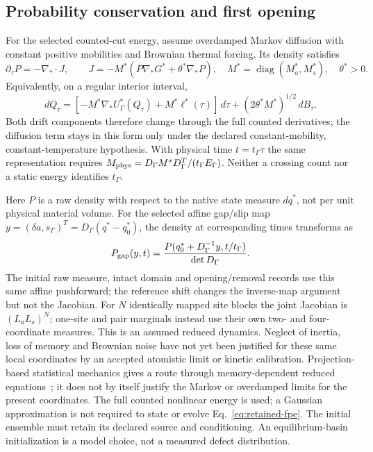 \documentclass[11pt]{article}
\begin{document}
\subsection{Probability conservation and first opening}
For the selected counted-cut energy, assume overdamped Markov diffusion with constant
positive mobilities and Brownian thermal forcing. Its density satisfies
\begin{equation}
 \partial_\tau P=-\nabla_*\!\cdot J,\qquad
 J=-M^*\left(P\nabla_*G^*+\theta^*\nabla_*P\right),\quad
 M^*=\operatorname{diag}(M_a^*,M_s^*),\quad\theta^*>0.
 \label{eq:retained-fpe}
\end{equation}
Equivalently, on a regular interior interval,
\begin{equation}
 dQ_\tau=[-M^*\nabla_*U_\Gamma^*(Q_\tau)+M^*\ell^*(\tau)]\,d\tau
                +(2\theta^*M^*)^{1/2}\,dB_\tau .
 \label{eq:r11-cut-sde}
\end{equation}
Both drift components therefore change through the full counted derivatives;
the diffusion term stays in this form only under the declared constant-mobility,
constant-temperature hypothesis. With physical time $t=t_\Gamma\tau$ the
same representation requires
$M_{\rm phys}=D_\Gamma M^*D_\Gamma^T/(t_\Gamma E_\Gamma)$.
Neither a crossing count nor a static energy identifies $t_\Gamma$.

Here $P$ is a raw density with respect to the native state measure $dq^*$,
not per unit physical material volume. For the selected affine gap/slip map
$y=(\delta a,s_\Gamma)^T=D_\Gamma(q^*-q_0^*)$, the density at corresponding
times transforms as
\begin{equation}
 P_{\rm gap}(y,t)=\frac{P(q_0^*+D_\Gamma^{-1}y,t/t_\Gamma)}{\det D_\Gamma}.
 \label{eq:r11-gap-density}
\end{equation}
The initial raw measure, intact domain and opening/removal records use this
same affine pushforward; the reference shift changes the inverse-map
argument but not the Jacobian. For $N$ identically mapped site blocks the
joint Jacobian is $(L_aL_s)^N$;
one-site and pair marginals instead use their own two- and four-coordinate measures.
This is an assumed reduced dynamics. Neglect of inertia, loss of memory and
Brownian noise have not yet been justified for these same local coordinates
by an accepted atomistic limit or kinetic calibration. Projection-based
statistical mechanics gives a route through memory-dependent reduced
equations~\cite{Mori1965}; it does not by itself justify the Markov or
overdamped limits for the present coordinates.
The full counted nonlinear energy is used; a Gaussian approximation is not required
to state or evolve Eq.~\eqref{eq:retained-fpe}.
The initial ensemble must retain its declared source and conditioning.
An equilibrium-basin initialization is a model choice, not a measured defect distribution.
\end{document}

